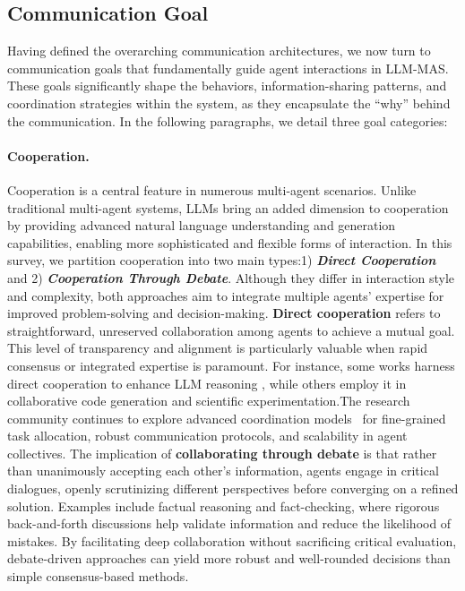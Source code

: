 \subsection{Communication Goal}
Having defined the overarching communication architectures, we now turn to communication goals that fundamentally guide agent interactions in LLM-MAS. These goals significantly shape the behaviors, information-sharing patterns, and coordination strategies within the system, as they encapsulate the “why” behind the communication. In the following paragraphs, we detail three goal categories:

\paragraph{Cooperation.} Cooperation is a central feature in numerous multi-agent scenarios. Unlike traditional multi-agent systems, LLMs bring an added dimension to cooperation by providing advanced natural language understanding and generation capabilities, enabling more sophisticated and flexible forms of interaction.  In this survey, we partition cooperation into two main types:1) \textbf{\emph{Direct Cooperation}} and 2) \textbf{\emph{Cooperation Through Debate}}. Although they differ in interaction style and complexity, both approaches aim to integrate multiple agents’ expertise for improved problem-solving and decision-making. \textbf{Direct cooperation} refers to straightforward, unreserved collaboration among agents to achieve a mutual goal. This level of transparency and alignment is particularly valuable when rapid consensus or integrated expertise is paramount. For instance,   some works harness direct cooperation to enhance LLM reasoning\cite{boostrapping,casualgpt_reasoning,autoagents} ,  while others employ it in collaborative code generation \cite{chatdev_software_development,soa_code_generation,magis_mas_for_github,mas_for_software_2,fixagent_mas_for_debug} and scientific experimentation\cite{chatsim_mas_make_scene,mas_use_tool}.The research community continues to explore advanced coordination models~\cite{agentcoord,govsim,mas_benchmark} for fine-grained task allocation, robust communication protocols, and scalability in agent collectives. The implication of \textbf{collaborating through debate} is that rather than unanimously accepting each other’s information, agents engage in critical dialogues, openly scrutinizing different perspectives before converging on a refined solution. Examples include factual reasoning\cite{debate_improve_llm_1} and fact-checking\cite{debate_2}, where rigorous back-and-forth discussions help validate information and reduce the likelihood of mistakes. By facilitating deep collaboration without sacrificing critical evaluation, debate-driven approaches can yield more robust and well-rounded decisions than simple consensus-based methods.

